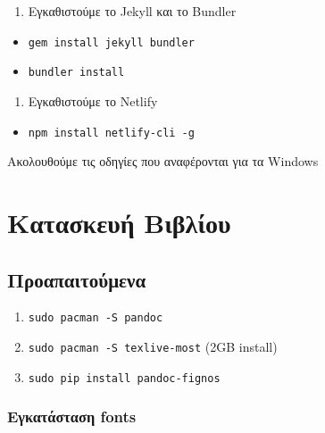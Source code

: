 \documentclass[
]{article}
\begin{document}
\begin{enumerate}
\item
  Εγκαθιστούμε το Jekyll και το Bundler
\end{enumerate}

\begin{itemize}
\item
  \texttt{gem~install~jekyll~bundler}
\item
  \texttt{bundler~install}
\end{itemize}

\begin{enumerate}
\item
  Εγκαθιστούμε το Netlify
\end{enumerate}

\begin{itemize}
\item
  \texttt{npm~install~netlify-cli~-g}
\end{itemize}

Ακολουθούμε τις οδηγίες που αναφέρονται για τα Windows

\hypertarget{ux3baux3b1ux3c4ux3b1ux3c3ux3baux3b5ux3c5ux3ae-ux3b2ux3b9ux3b2ux3bbux3afux3bfux3c5}{%
\section{Κατασκευή
Βιβλίου}\label{ux3baux3b1ux3c4ux3b1ux3c3ux3baux3b5ux3c5ux3ae-ux3b2ux3b9ux3b2ux3bbux3afux3bfux3c5}}

\hypertarget{ux3c0ux3c1ux3bfux3b1ux3c0ux3b1ux3b9ux3c4ux3bfux3cdux3bcux3b5ux3bdux3b1}{%
\subsection{Προαπαιτούμενα}\label{ux3c0ux3c1ux3bfux3b1ux3c0ux3b1ux3b9ux3c4ux3bfux3cdux3bcux3b5ux3bdux3b1}}

\begin{enumerate}
\item
  \texttt{sudo~pacman~-S~pandoc}
\item
  \texttt{sudo~pacman~-S~texlive-most} (2GB install)
\item
  \texttt{sudo~pip~install~pandoc-fignos}
\end{enumerate}

\hypertarget{ux3b5ux3b3ux3baux3b1ux3c4ux3acux3c3ux3c4ux3b1ux3c3ux3b7-fonts}{%
\subsubsection{Εγκατάσταση
fonts}\label{ux3b5ux3b3ux3baux3b1ux3c4ux3acux3c3ux3c4ux3b1ux3c3ux3b7-fonts}}
\end{document}
